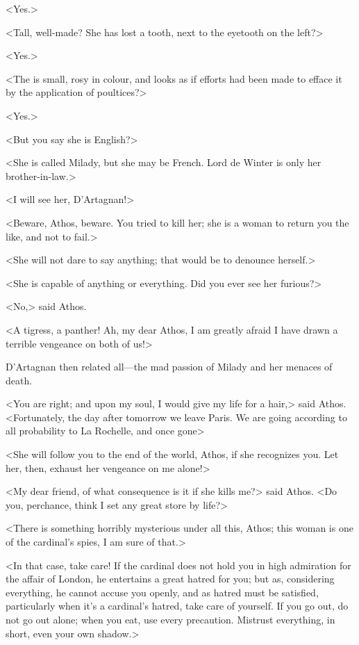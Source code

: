 <Yes.> 

<Tall, well-made? She has lost a tooth, next to the eyetooth on the left?> 

<Yes.> 

<The  is small, rosy in colour, and looks as if efforts had been made to efface it by the application of poultices?> 

<Yes.> 

<But you say she is English?> 

<She is called Milady, but she may be French. Lord de Winter is only her brother-in-law.> 

<I will see her, D'Artagnan!> 

<Beware, Athos, beware. You tried to kill her; she is a woman to return you the like, and not to fail.> 

<She will not dare to say anything; that would be to denounce herself.> 

<She is capable of anything or everything. Did you ever see her furious?> 

<No,> said Athos. 

<A tigress, a panther! Ah, my dear Athos, I am greatly afraid I have drawn a terrible vengeance on both of us!> 

D'Artagnan then related all—the mad passion of Milady and her menaces of death. 

<You are right; and upon my soul, I would give my life for a hair,> said Athos. <Fortunately, the day after tomorrow we leave Paris. We are going according to all probability to La Rochelle, and once gone\longdash> 

<She will follow you to the end of the world, Athos, if she recognizes you. Let her, then, exhaust her vengeance on me alone!> 

<My dear friend, of what consequence is it if she kills me?> said Athos. <Do you, perchance, think I set any great store by life?> 

<There is something horribly mysterious under all this, Athos; this woman is one of the cardinal's spies, I am sure of that.> 

<In that case, take care! If the cardinal does not hold you in high admiration for the affair of London, he entertains a great hatred for you; but as, considering everything, he cannot accuse you openly, and as hatred must be satisfied, particularly when it's a cardinal's hatred, take care of yourself. If you go out, do not go out alone; when you eat, use every precaution. Mistrust everything, in short, even your own shadow.> 

